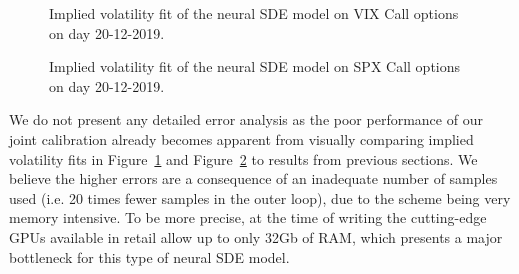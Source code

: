 \begin{figure}[H]
\centering
{}
\caption{Implied volatility fit of the neural SDE model on VIX Call options on day 20-12-2019.}\label{fig:NSDEvixcall}
\end{figure}


\begin{figure}[H]
\centering
{}
\caption{Implied volatility fit of the neural SDE model on SPX Call options on day 20-12-2019.}\label{fig:NSDEspxcall}
\end{figure}

We do not present any detailed error analysis as the poor performance of our joint calibration already becomes apparent from visually comparing implied volatility fits in Figure~\ref{fig:NSDEvixcall} and Figure~\ref{fig:NSDEspxcall} to results from previous sections. We believe the higher errors are a consequence of an inadequate number of samples used (i.e. 20 times fewer samples in the outer loop), due to the scheme being very memory intensive. To be more precise, at the time of writing the cutting-edge GPUs available in retail allow up to only 32Gb of RAM, which presents a major bottleneck for this type of neural SDE model.


